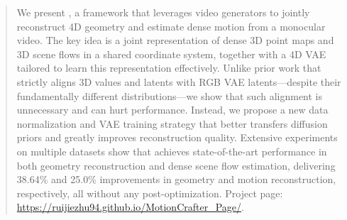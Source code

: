 \begin{abstract}
We present \method,
a framework that leverages video generators to jointly reconstruct 4D geometry and estimate dense motion from a monocular video.
The key idea is a joint representation of dense 3D point maps and 3D scene flows in a shared coordinate system,
together with a 4D VAE tailored to learn this representation effectively.
Unlike prior work that strictly aligns 3D values and latents with RGB VAE latents—despite their fundamentally different distributions—we show that such alignment is unnecessary and can hurt performance.
Instead, we propose a new data normalization and VAE training strategy that better transfers diffusion priors and greatly improves reconstruction quality.
Extensive experiments on multiple datasets show that \method achieves state-of-the-art performance in both geometry reconstruction and dense scene flow estimation,
delivering 38.64\% and 25.0\% improvements in geometry and motion reconstruction, respectively, all without any post-optimization. 
{Project page: \url{https://ruijiezhu94.github.io/MotionCrafter_Page/}.}
\end{abstract}